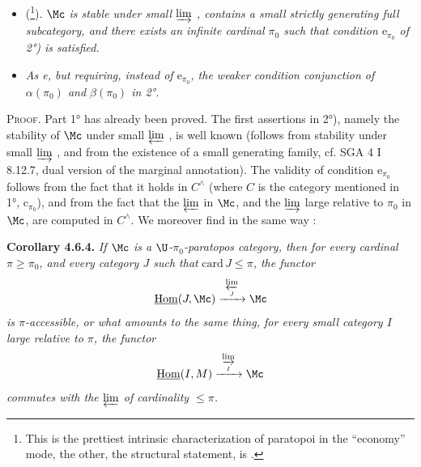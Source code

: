 
\begin{itemize}[leftmargin=4em]
\item[\circled{e}] (\footnote[60]{This is the prettiest intrinsic characterization of paratopoi in the ``economy'' mode, the other, the structural statement, is  .}). \textit{$\Mc$ is stable under small $\varinjlim$ , contains a small strictly generating full subcategory, and there exists an infinite cardinal $\pi_0$ such that condition $\mathrm{e}_{\pi_0}$ of 2°) is satisfied.}
\item[\circled{e$'$}] \textit{As e, but requiring, instead of $\mathrm{e}_{\pi_0}$, the weaker condition conjunction of $\alpha(\pi_0)$ and $\beta(\pi_0)$ in 2°.}
\end{itemize}


\textsc{Proof}. Part 1° has already been proved. The first assertions in 2°), namely the stability of $\Mc$ under small $\varprojlim$ , is well known (follows from stability under small $\varinjlim$ , and from the existence of a small generating family, cf. SGA 4 I 8.12.7, dual version of the marginal annotation). The validity of condition $\mathrm{e}_{\pi_0}$ follows from the fact that it holds in $C^{\wedge}$ (where $C$ is the category mentioned in 1°, $\mathrm{c}_{\pi_0}$), and from the fact that the $\varprojlim$ in $\Mc$, and the $\varinjlim$ large relative to $\pi_0$ in $\Mc$, are computed in $C^{\wedge}$. We moreover find in the same way : %

\textbf{Corollary 4.6.4.} \textit{If $\Mc$ is a $\U$-$\pi_0$-paratopos category, then for every cardinal $\pi \geqslant \pi_0$, and every category $J$ such that} $\mathrm{card}\, J \leqslant \pi$\textit{, the functor} %
\[
\underline{\mathrm{Hom}}(J,\Mc) \xrightarrow{\ \varprojlim\limits_{J}\ } \Mc
\]
\textit{is $\pi$-accessible, or what amounts to the same thing, for every small category $I$ large relative to $\pi$, the functor}
\[
\underline{\mathrm{Hom}}(I,M) \xrightarrow{\ \varinjlim\limits_{I}\ } \Mc %
\]
\textit{commutes with the $\varprojlim$ of cardinality $\leqslant \pi$.}

